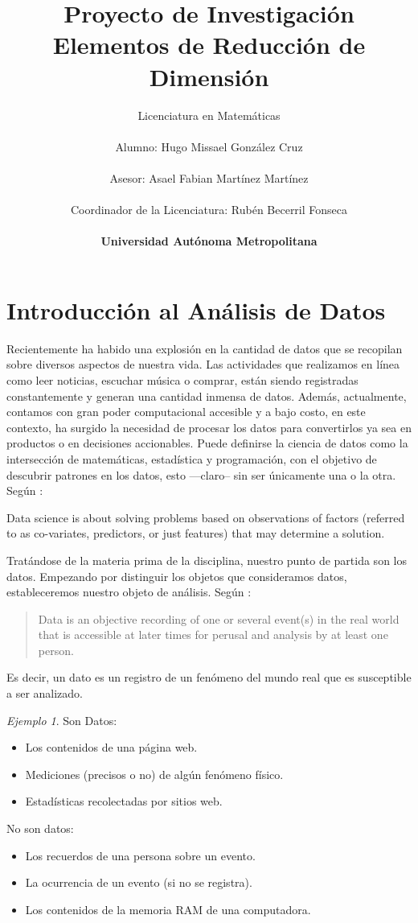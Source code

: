 \documentclass{article}
\title{
\Large Proyecto de Investigación\\
\vspace*{0.3in}
\textbf{Elementos de Reducción de Dimensión}
}
\author{
    Licenciatura en Matemáticas\\
    \vspace*{0.8in} \\
    Alumno: Hugo Missael González Cruz\\
    \vspace*{0.5in} \\
    Asesor: Asael Fabian Martínez Martínez\\
    \vspace*{0.5in} \\
    Coordinador de la Licenciatura: Rubén Becerril Fonseca\\
    \vspace*{2in} \\
    \textbf{Universidad Autónoma Metropolitana}\\
} \date{}
\numberwithin{equation}{section}
\theoremstyle{remark}
\newtheorem{example}{Ejemplo}
\theoremstyle{definition}
\theoremstyle{remark}
\theoremstyle{remark}
\begin{document}
\maketitle
\thispagestyle{empty}
\pagebreak
\tableofcontents
{}
\pagebreak
\section{Introducción al Análisis de Datos}
Recientemente ha habido una explosión en la cantidad de datos que se recopilan sobre diversos aspectos de nuestra vida. 
Las actividades que realizamos en línea como leer noticias, escuchar música o comprar, están siendo registradas
constantemente y generan una cantidad inmensa de datos. Además, actualmente, contamos con gran poder computacional
accesible y a bajo costo, en este contexto, ha surgido la necesidad de procesar los datos para convertirlos
ya sea en productos o en decisiones accionables.
Puede definirse la ciencia de datos como la intersección de matemáticas, estadística y programación, con el objetivo
de descubrir patrones en los datos, esto ---claro-- sin ser únicamente una o la otra.
Según \textcite{Garzon2022}:

\begin{displayquote}
Data science is about solving problems based on
observations of factors (referred to as co-variates, predictors, or just features) 
that may determine a solution. 
\end{displayquote}

Tratándose de la materia prima de la disciplina, nuestro punto de partida son los datos. 
Empezando por distinguir los objetos que consideramos datos, estableceremos nuestro objeto de análisis.
Según \textcite{Garzon2022}:
\begin{quote}
    Data is an objective recording of one or several event(s) in the real world that is 
    accessible at later times for perusal and analysis by at least one person.
\end{quote} 

Es decir, un dato es un registro de un fenómeno del mundo real que es susceptible a ser analizado.

\begin{example}
    Son Datos:
    \begin{itemize}
        \item Los contenidos de una página web.
        \item Mediciones (precisos o no) de algún fenómeno físico.
        \item Estadísticas recolectadas por sitios web.
    \end{itemize}
    No son datos:
    \begin{itemize}
    \item Los recuerdos de una persona sobre un evento.
    \item La ocurrencia de un evento (si no se registra).
    \item Los contenidos de la memoria RAM de una computadora.
    \end{itemize}
\end{example}
\end{document}
